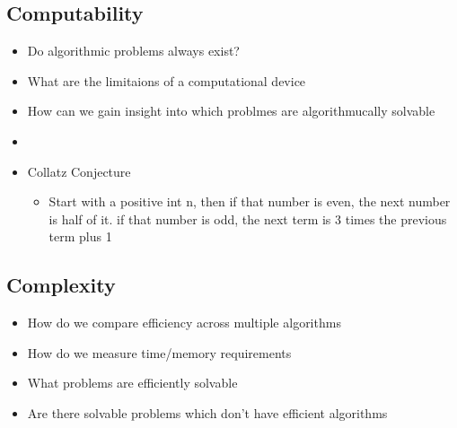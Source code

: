 \documentclass{article}
\begin{document}
    \subsection{Computability}
    \begin{itemize}
        \item{Do algorithmic problems always exist?}
        \item{What are the limitaions of a computational device}
        \item{How can we gain insight into which problmes are algorithmucally solvable}
        \item{}
        \item{Collatz Conjecture}
            \begin{itemize}
                \item{Start with a positive int n, then if that number is even, the next number is half of it. if that number is odd, the next term is 3 times the previous term plus 1}
            \end{itemize}
    \end{itemize}

    \subsection{Complexity}
    \begin{itemize}
        \item{How do we compare efficiency across multiple algorithms}
        \item{How do we measure time/memory requirements}
        \item{What problems are efficiently solvable}
        \item{Are there solvable problems which don't have efficient algorithms}
    \end{itemize}
\end{document}
